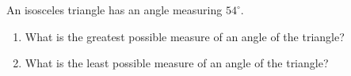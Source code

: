 An isosceles triangle has an angle measuring $54^\circ$.
\begin{enumerate}
\item[(a)] What is the greatest possible measure of an angle of the triangle?
\item[(b)] What is the least possible measure of an angle of the triangle?
\end{enumerate}
